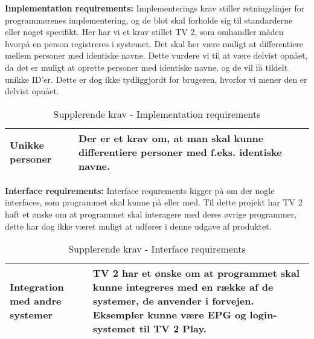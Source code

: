 \begin{itemize}
    \textbf{Implementation requirements:}
    Implementerings krav stiller retningslinjer for programmørenes implementering, og de blot skal forholde sig til standarderne eller noget specifikt. Her har vi et krav stillet TV 2, som omhandler måden hvorpå en person registreres i systemet. Det skal her være muligt at differentiere mellem personer med identiske navne. Dette vurdere vi til at være delvist opnået, da det er muligt at oprette personer med identiske navne, og de vil få tildelt unikke ID'er. Dette er dog ikke tydliggjordt for brugeren, hvorfor vi mener den er delvist opnået. 
    
    
        \begin{table}[H]
        \centering
        \begin{tabular}{|p{30mm}|p{90mm}|}
        \hline
            Unikke personer & Der er et krav om, at man skal kunne differentiere personer med f.eks. identiske navne.
        \\ \hline
        \end{tabular}
            \caption{Supplerende krav - Implementation requirements}
            \label{tab:Implementation_requirements}
        \end{table}
        
    \textbf{Interface requirements:}
    Interface requrements kigger på om der nogle interfaces, som programmet skal kunne på eller med. Til dette projekt har TV 2 haft et ønske om at programmet skal interagere med deres øvrige programmer, dette har dog ikke været muligt at udfører i denne udgave af produktet.
        \begin{table}[H]
        \centering
        \begin{tabular}{|p{30mm}|p{90mm}|}
        \hline
            Integration med andre systemer & TV 2 har et ønske om at programmet skal kunne integreres med en række af de systemer, de anvender i forvejen. Eksempler kunne være EPG og login-systemet til TV 2 Play.
        \\ \hline
        \end{tabular}
            \caption{Supplerende krav - Interface requirements}
            \label{tab:Interface_requirements}
        \end{table}
    
\end{itemize}
